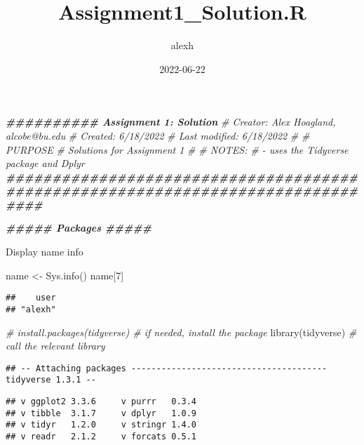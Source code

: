 \documentclass[
]{article}
\title{Assignment1\_Solution.R}
\author{alexh}
\date{2022-06-22}
\newenvironment{Shaded}{\begin{snugshade}}{\end{snugshade}}
\newcommand{\CommentTok}[1]{\textcolor[rgb]{0.56,0.35,0.01}{\textit{#1}}}
\newcommand{\DecValTok}[1]{\textcolor[rgb]{0.00,0.00,0.81}{#1}}
\newcommand{\DocumentationTok}[1]{\textcolor[rgb]{0.56,0.35,0.01}{\textbf{\textit{#1}}}}
\newcommand{\FunctionTok}[1]{\textcolor[rgb]{0.00,0.00,0.00}{#1}}
\newcommand{\NormalTok}[1]{#1}
\newcommand{\OtherTok}[1]{\textcolor[rgb]{0.56,0.35,0.01}{#1}}
\begin{document}
\maketitle

\begin{Shaded}
\begin{Highlighting}[]
\DocumentationTok{\#\#\#\#\#\#\#\#\#\# Assignment 1: Solution}
\CommentTok{\# Creator: Alex Hoagland, alcobe@bu.edu}
\CommentTok{\# Created: 6/18/2022}
\CommentTok{\# Last modified: 6/18/2022}
\CommentTok{\#}
\CommentTok{\# PURPOSE}
\CommentTok{\#   Solutions for Assignment 1}
\CommentTok{\#}
\CommentTok{\# NOTES: }
\CommentTok{\#   {-} uses the Tidyverse package and Dplyr}
\DocumentationTok{\#\#\#\#\#\#\#\#\#\#\#\#\#\#\#\#\#\#\#\#\#\#\#\#\#\#\#\#\#\#\#\#\#\#\#\#\#\#\#\#\#\#\#\#\#\#\#\#\#\#\#\#\#\#\#\#\#\#\#\#\#\#\#\#\#\#\#\#\#\#\#\#\#\#\#\#\#\#\#\#}


\DocumentationTok{\#\#\#\#\# Packages \#\#\#\#\#}
\end{Highlighting}
\end{Shaded}

Display name info

\begin{Shaded}
\begin{Highlighting}[]
\NormalTok{name }\OtherTok{\textless{}{-}} \FunctionTok{Sys.info}\NormalTok{()}
\NormalTok{name[}\DecValTok{7}\NormalTok{]}
\end{Highlighting}
\end{Shaded}

\begin{verbatim}
##    user 
## "alexh"
\end{verbatim}

\begin{Shaded}
\begin{Highlighting}[]
\CommentTok{\# install.packages(\textquotesingle{}tidyverse\textquotesingle{}) \# if needed, install the package}
\FunctionTok{library}\NormalTok{(tidyverse) }\CommentTok{\# call the relevant library}
\end{Highlighting}
\end{Shaded}

\begin{verbatim}
## -- Attaching packages --------------------------------------- tidyverse 1.3.1 --
\end{verbatim}

\begin{verbatim}
## v ggplot2 3.3.6     v purrr   0.3.4
## v tibble  3.1.7     v dplyr   1.0.9
## v tidyr   1.2.0     v stringr 1.4.0
## v readr   2.1.2     v forcats 0.5.1
\end{verbatim}
\end{document}
